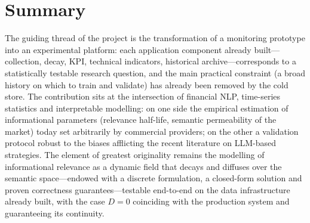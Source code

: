 \documentclass[a4paper,11pt]{article}
\begin{document}
\section{Summary}

The guiding thread of the project is the transformation of a monitoring prototype into an experimental platform: each application component already built---collection, decay, KPI, technical indicators, historical archive---corresponds to a statistically testable research question, and the main practical constraint (a broad history on which to train and validate) has already been removed by the cold store. The contribution sits at the intersection of financial NLP, time-series statistics and interpretable modelling: on one side the empirical estimation of informational parameters (relevance half-life, semantic permeability of the market) today set arbitrarily by commercial providers; on the other a validation protocol robust to the biases afflicting the recent literature on LLM-based strategies. The element of greatest originality remains the modelling of informational relevance as a dynamic field that decays and diffuses over the semantic space---endowed with a discrete formulation, a closed-form solution and proven correctness guarantees---testable end-to-end on the data infrastructure already built, with the case $D=0$ coinciding with the production system and guaranteeing its continuity.

\printbibliography
\end{document}
